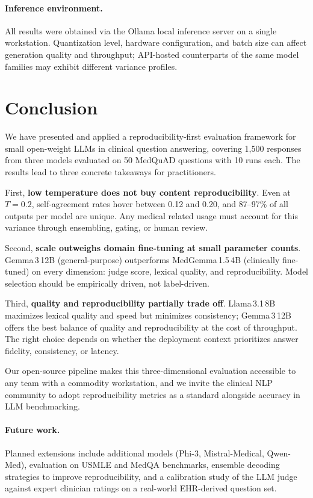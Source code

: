 \documentclass[11pt,twocolumn]{article}
\begin{document}
\paragraph{Inference environment.}
All results were obtained via the Ollama local inference server on a
single workstation.
Quantization level, hardware configuration, and batch size can affect
generation quality and throughput; API-hosted counterparts of the same
model families may exhibit different variance profiles.

\section{Conclusion}

We have presented and applied a reproducibility-first evaluation
framework for small open-weight LLMs in clinical question answering,
covering 1,500 responses from three models evaluated on 50 MedQuAD
questions with 10 runs each.
The results lead to three concrete takeaways for practitioners.

First, \textbf{low temperature does not buy content reproducibility}.
Even at $T{=}0.2$, self-agreement rates hover between 0.12 and 0.20,
and 87--97\% of all outputs per model are unique.
Any medical related usage must account for this variance through
ensembling, gating, or human review.

Second, \textbf{scale outweighs domain fine-tuning at small parameter
counts}.
Gemma\,3\,12B (general-purpose) outperforms MedGemma\,1.5\,4B
(clinically fine-tuned) on every dimension: judge score, lexical
quality, and reproducibility.
Model selection should be empirically driven, not label-driven.

Third, \textbf{quality and reproducibility partially trade off}.
Llama\,3.1\,8B maximizes lexical quality and speed but minimizes
consistency; Gemma\,3\,12B offers the best balance of quality and
reproducibility at the cost of throughput.
The right choice depends on whether the deployment context prioritizes
answer fidelity, consistency, or latency.

Our open-source pipeline makes this three-dimensional evaluation
accessible to any team with a commodity workstation, and we invite
the clinical NLP community to adopt reproducibility metrics as a
standard alongside accuracy in LLM benchmarking.

\paragraph{Future work.}
Planned extensions include additional models (Phi-3, Mistral-Medical,
Qwen-Med), evaluation on USMLE and MedQA benchmarks, ensemble
decoding strategies to improve reproducibility, and a calibration
study of the LLM judge against expert clinician ratings on a
real-world EHR-derived question set.
\end{document}
